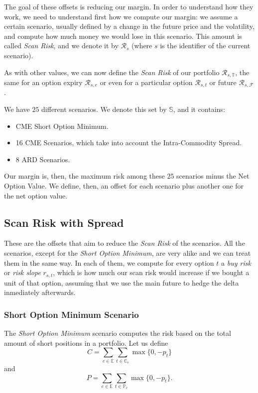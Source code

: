 \documentclass[10pt, a4paper, oneside]{article}
\newcommand{\expiries}{\ensuremath{\mathbb{E}}}
\newcommand{\puts}{\ensuremath{\mathbb{P}}}
\newcommand{\calls}{\ensuremath{\mathbb{C}}}
\newcommand{\mfuture}{\ensuremath{\mathcal{F}}}
\newcommand{\total}{\ensuremath{\mathbb{T}}}
\newcommand{\scenarios}{\ensuremath{\mathbb{S}}}
\newcommand{\pos}{\ensuremath{p}}
\newcommand{\risk}{\ensuremath{\mathcal{R}}}
\begin{document}
\noindent The goal of these offsets is reducing our margin. In order to understand how they work, we need to understand first how we compute our margin: we assume a certain scenario, usually defined by a change
in the future price and the volatility, and compute how much money we would lose in this scenario. This amount is called \emph{Scan Risk}, and we denote it by $\risk_s$ (where $s$ is the identifier
of the current scenario).

\noindent As with other values, we can now define the \emph{Scan Risk} of our portfolio $\risk_{s, \total}$, the same for an option expiry $\risk_{s, e}$ or even for a particular option $\risk_{s, t}$
or future $\risk_{s, \mfuture}$.

\noindent We have $25$ different scenarios. We denote this set by $\scenarios$, and it contains:
\begin{itemize}
 \item CME Short Option Minimum.
 \item 16 CME Scenarios, which take into account the Intra-Commodity Spread.
 \item 8 ARD Scenarios.
\end{itemize}

\noindent Our margin is, then, the maximum risk among these $25$ scenarios minus the Net Option Value. We define, then, an offset for each scenario plus another one for the net option value.



\subsection{Scan Risk with Spread}

\noindent These are the offsets that aim to reduce the \emph{Scan Risk} of the scenarios. All the scenarios, except for the \emph{Short Option Minimum}, are very alike and we can treat them in the same way. In each of them,
we compute for every option $t$ a \emph{buy risk} or \emph{risk slope} $r_{s, t}$, which is how much our scan risk would increase if we bought a unit of that option, assuming that we use the main future to hedge 
the delta inmediately afterwards.

\subsubsection{Short Option Minimum Scenario}

\noindent The \emph{Short Option Minimum} scenario computes the risk based on the total amount of short positions in a portfolio. Let us define
\[C = \sum_{e\in\expiries}\sum_{t\in\calls_e}\max\{0, -\pos_t\} \]
and
\[P = \sum_{e\in\expiries}\sum_{t\in\puts_e}\max\{0, -\pos_t\}. \]
\end{document}
